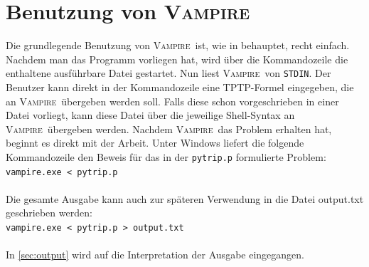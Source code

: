 \documentclass{article}
\newcommand{\vampire}{\textsc{Vampire}~}
\begin{document}
\section{Benutzung von \vampire}
\label{sec:invocation}
Die grundlegende Benutzung von \vampire ist, wie in \cite{cav2013} behauptet, recht einfach. Nachdem man das Programm vorliegen hat, wird über die Kommandozeile die enthaltene ausführbare Datei gestartet. Nun liest \vampire von \texttt{STDIN}. Der Benutzer kann direkt in der Kommandozeile eine TPTP-Formel eingegeben, die an \vampire übergeben werden soll. Falls diese schon vorgeschrieben in einer Datei vorliegt, kann diese Datei über die jeweilige Shell-Syntax an \vampire übergeben werden. Nachdem \vampire das Problem erhalten hat, beginnt es direkt mit der Arbeit. 
Unter Windows liefert die folgende Kommandozeile den Beweis für das in der \verb|pytrip.p| 
formulierte Problem:\\

\texttt{vampire.exe < pytrip.p}\\\\
Die gesamte Ausgabe kann auch zur späteren Verwendung in die Datei output.txt geschrieben werden:\\

\texttt{vampire.exe < pytrip.p > output.txt}\\\\
In \ref{sec:output} wird auf die Interpretation der Ausgabe eingegangen.
\end{document}

